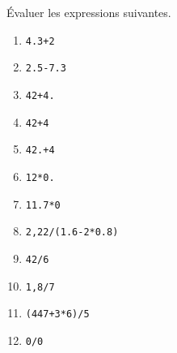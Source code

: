  \question
\'Evaluer les expressions suivantes.
\begin{multicols}{2}
  \begin{enumerate}[label=\emph{\alph*)}]
    \item \texttt{4.3+2}
    \item \texttt{2.5-7.3}
    \item \texttt{42+4.}
    \item \texttt{42+4}
    \item \texttt{42.+4}
    \item \texttt{12*0.}
    \item \texttt{11.7*0}
    \item \texttt{2,22/(1.6-2*0.8)}
    \item \texttt{42/6}
    \item \texttt{1,8/7}
    \item \texttt{(447+3*6)/5}
    \item \texttt{0/0}
  \end{enumerate}
\end{multicols}

